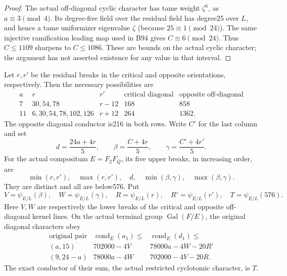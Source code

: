\begin{proof}
The actual off-diagonal cyclic character has tame weight
$\zeta^6$, as $a\equiv3\pmod4$. Its degree-five field over the
residual field has degree25 over $L$, and hence a tame
uniformizer eigenvalue $\zeta$ (because $25\equiv1\pmod{24}$).
The same injective ramification leading map used in B94 gives
$C\equiv6\pmod{24}$. Thus $C\le1109$ sharpens to $C\le1086$.
These are bounds on the actual cyclic character; the argument
has not asserted existence for any value in that interval.
\end{proof}

\begin{proposition}
\label{prop:B-RD95-profiles}
Let $r,r'$ be the residual breaks in the critical and opposite
orientations, respectively. Then the necessary possibilities are
\[
\begin{array}{c|c|c|c|c}
 a&r&r'&\text{critical diagonal}&\text{opposite off-diagonal}\\\hline
 7&30,54,78&r-12&168&858\\
 11&6,30,54,78,102,126&r+12&264&1362.
\end{array}                                           \tag{B-RD95.7}
\]
The opposite diagonal conductor is216 in both rows. Write $C'$ for
the last column and set
\[
 d=\frac{24a+4r}{5},\qquad
 \beta=\frac{C+4r}{5},\qquad
 \gamma=\frac{C'+4r'}{5}.                            \tag{B-RD95.8}
\]
For the actual compositum $E=F_2F_Q$, its five upper breaks, in
increasing order, are
\[
       \min(r,r'),\quad\max(r,r'),\quad d,\quad
                     \min(\beta,\gamma),\quad\max(\beta,\gamma).
                                                        \tag{B-RD95.9}
\]
They are distinct and all are below576. Put
\[
 V=\psi_{E/L}(\beta),\quad W=\psi_{E/L}(\gamma),\quad
 R=\psi_{E/L}(r),\quad R'=\psi_{E/L}(r'),\quad
 T=\psi_{E/L}(576).                                 \tag{B-RD95.10}
\]
Here $V,W$ are respectively the lower breaks of the critical and
opposite off-diagonal kernel lines. On the actual terminal group
$\operatorname{Gal}(F/E)$, the original diagonal characters obey
\[
\begin{array}{c|c|c}
 \text{original pair}&\operatorname{cond}_E(a_1)\le&
                         \operatorname{cond}_E(d_1)\le\\\hline
 (a,15)&702000-4V&78000a-4W-20R'\\
 (9,24-a)&78000a-4W&702000-4V-20R.
\end{array}                                           \tag{B-RD95.11}
\]
The exact conductor of their sum, the actual restricted cyclotomic
character, is $T$.
\end{proposition}
